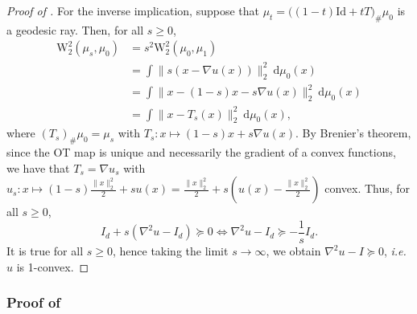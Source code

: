 \documentclass[twoside]{article}
\newcommand{\W}{\mathrm{W}}
\newcommand{\id}{\mathrm{Id}}
\begin{document}
\begin{proof}[Proof of ]
    For the inverse implication, suppose that $\mu_t = \big((1-t)\id +t T\big)_\#\mu_0$ is a geodesic ray. Then, for all $s\ge 0$,
    \begin{equation}
        \begin{aligned}
            \W_2^2(\mu_s, \mu_0) &= s^2 \W_2^2(\mu_0, \mu_1) \\
            &= \int \| s (x - \nabla u(x))\|_2^2 \ \mathrm{d}\mu_0(x) \\
            &= \int \| x - (1-s)x - s \nabla u(x) \|_2^2 \ \mathrm{d}\mu_0(x) \\
            &= \int \| x - T_s(x) \|_2^2 \ \mathrm{d}\mu_0(x),
        \end{aligned}
    \end{equation}
    where $(T_s)_\#\mu_0 = \mu_s$ with $T_s:x\mapsto (1-s)x+s\nabla u(x)$. By Brenier's theorem, since the OT map is unique and necessarily the gradient of a convex functions, we have that $T_s = \nabla u_s$ with $u_s: x \mapsto (1-s)\frac{\|x\|_2^2}{2} + s u(x) = \frac{\|x\|_2^2}{2} + s \left(u(x)-\frac{\|x\|_2^2}{2} \right)$ convex. 
    Thus, for all $s\ge 0$, 
    \begin{equation}
        I_d + s (\nabla^2 u - I_d) \succeq 0 \iff \nabla^2 u - I_d \succeq - \frac{1}{s} I_d.
    \end{equation}
    It is true for all $s\ge 0$, hence taking the limit $s\to\infty$, we obtain  $\nabla^2 u - I \succeq 0$, \emph{i.e.} $u$ is 1-convex.
\end{proof}


\subsubsection{Proof of } \label{proof:prop_1d_geodesic_rays}
\end{document}

